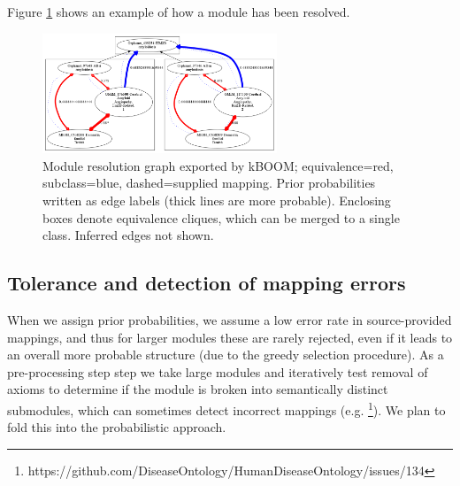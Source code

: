 \documentclass{my}
\begin{document}
Figure \ref{fig:graph} shows an example of how a module has been
resolved.

\begin{figure}
\center
\includegraphics[width=7cm]{amyloidosis}
\caption{Module resolution graph exported by kBOOM; equivalence=red,
  subclass=blue, dashed=supplied mapping. Prior probabilities written
  as edge labels (thick lines are more probable). Enclosing boxes
  denote equivalence cliques, which can be merged to a single class. Inferred edges not shown.}
\label{fig:graph}
\end{figure}

\subsection{Tolerance and detection of mapping errors}

When we assign prior probabilities, we assume a low error rate in
source-provided mappings, and thus for larger modules these are rarely
rejected, even if it leads to an overall more probable structure (due
to the greedy selection procedure). As a pre-processing step step we
take large modules and iteratively test removal of axioms to determine
if the module is broken into semantically distinct submodules, which
can sometimes detect incorrect mappings (e.g. \footnote{https://github.com/DiseaseOntology/HumanDiseaseOntology/issues/134}). We
plan to fold this into the probabilistic approach.


\end{document}
